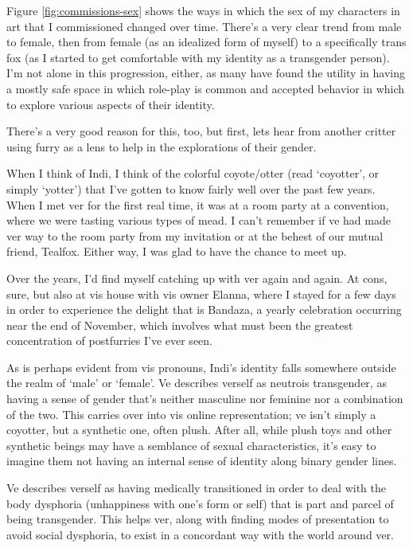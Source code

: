 Figure \ref{fig:commissions-sex} shows the ways in which the sex of my characters in art that I commissioned changed over time.  There's a very clear trend from male to female, then from female (as an idealized form of myself) to a specifically trans fox (as I started to get comfortable with my identity as a transgender person).  I'm not alone in this progression, either, as many have found the utility in having a mostly safe space in which role-play is common and accepted behavior in which to explore various aspects of their identity.

There's a very good reason for this, too, but first, lets hear from another critter using furry as a lens to help in the explorations of their gender.

\secdiv

When I think of Indi, I think of the colorful coyote/otter (read `coyotter', or simply `yotter') that I've gotten to know fairly well over the past few years.  When I met ver for the first real time, it was at a room party at a convention, where we were tasting various types of mead.  I can't remember if ve had made ver way to the room party from my invitation or at the behest of our mutual friend, Tealfox.  Either way, I was glad to have the chance to meet up.

Over the years, I'd find myself catching up with ver again and again.  At cons, sure, but also at vis house with vis owner Elanna, where I stayed for a few days in order to experience the delight that is Bandaza, a yearly celebration occurring near the end of November, which involves what must been the greatest concentration of postfurries I've ever seen.

As is perhaps evident from vis pronouns, Indi's identity falls somewhere outside the realm of `male' or `female'.  Ve describes verself as neutrois transgender, as having a sense of gender that's neither masculine nor feminine nor a combination of the two. This carries over into vis online representation; ve isn't simply a coyotter, but a synthetic one, often plush. After all, while plush toys and other synthetic beings may have a semblance of sexual characteristics, it's easy to imagine them not having an internal sense of identity along binary gender lines.

Ve describes verself as having medically transitioned in order to deal with the body dysphoria (unhappiness with one's form or self) that is part and parcel of being transgender.  This helps ver, along with finding modes of presentation to avoid social dysphoria, to exist in a concordant way with the world around ver.

